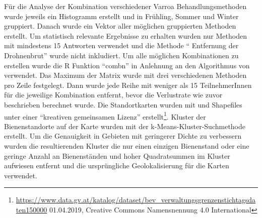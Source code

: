 \newline
Für die Analyse der Kombination verschiedener Varroa Behandlungsmethoden wurde jeweils ein Histogramm erstellt und in Frühling, Sommer und Winter gruppiert. Danach wurde ein Vektor aller möglichen gruppierten Methoden erstellt. Um statistisch relevante Ergebnisse zu erhalten wurden nur Methoden mit mindestens 15 Antworten verwendet und die Methode \enquote{ Entfernung der Drohnenbrut} wurde nicht inkludiert. Um alle möglichen Kombinationen zu erstellen wurde die R Funktion \enquote{combn} in Anlehnung an den Algorithmus von \cite{nijenhuis1978} verwendet. Das Maximum der Matrix wurde mit drei verschiedenen Methoden pro Zeile festgelegt. Dann wurde jede Reihe mit weniger als 15 TeilnehmerInnen für die jeweilige Kombination entfernt, bevor die Verlustrate wie zuvor beschrieben berechnet wurde.
\newline
Die Standortkarten wurden mit \cite{rcoreteam2020} und Shapefiles unter einer \enquote{kreativen gemeinsamen Lizenz} erstellt\footnote{\url{https://www.data.gv.at/katalog/dataset/bev_verwaltungsgrenzenstichtagsdaten150000} 01.04.2019, Creative Commons Namensnennung 4.0 International }. Kluster der Bienenstandorte auf der Karte wurden mit der k-Means-Kluster-Suchmethode erstellt. Um die Genauigkeit in Gebieten mit geringerer Dichte zu verbessern wurden die resultierenden Kluster die nur einen einzigen Bienenstand oder eine geringe Anzahl an Bienenständen und hoher Quadratsummen im Kluster aufwiesen entfernt und die ursprüngliche Geolokalisierung für die Karten verwendet.
